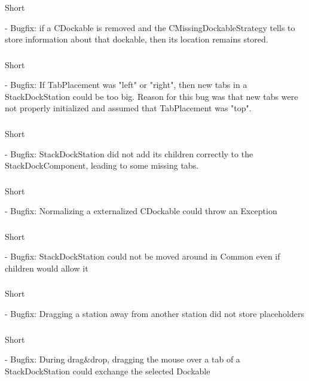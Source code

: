 \documentclass[a4paper,10pt]{article}
\newcommand{\short}{\item[Short]}
\begin{document}
\subsubsection{}
\begin{description}
 \short 
\end{description}
- Bugfix: if a CDockable is removed and the CMissingDockableStrategy tells to store information about that dockable, then its location remains stored.
\subsubsection{}
\begin{description}
 \short 
\end{description}
- Bugfix: If TabPlacement was "left" or "right", then new tabs in a StackDockStation could be too big. Reason for this bug was that new tabs were not properly initialized and assumed that TabPlacement was "top".     
\subsubsection{}
\begin{description}
 \short 
\end{description}
- Bugfix: StackDockStation did not add its children correctly to the StackDockComponent, leading to some missing tabs.    
\subsubsection{}
\begin{description}
 \short 
\end{description}
- Bugfix: Normalizing a externalized CDockable could throw an Exception
\subsubsection{}
\begin{description}
 \short 
\end{description}
- Bugfix: StackDockStation could not be moved around in Common even if children would allow it
\subsubsection{}
\begin{description}
 \short 
\end{description}
- Bugfix: Dragging a station away from another station did not store placeholders
\subsubsection{}
\begin{description}
 \short 
\end{description}
- Bugfix: During drag&drop, dragging the mouse over a tab of a StackDockStation could exchange the selected Dockable
\end{document}
